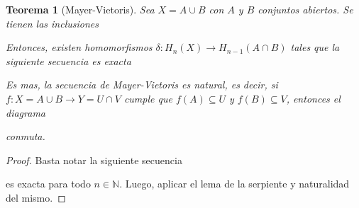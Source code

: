 \documentclass[aop]{imsart2}
\theoremstyle{plain}
\newtheorem{teo}{Teorema}[section]
\theoremstyle{remark}
\def \N {\mathbb{N}}
\begin{document}
\begin{teo}[Mayer-Vietoris]
    Sea $X=A\cup B$ con $A$ y $B$ conjuntos abiertos. Se tienen las inclusiones
    
    \vspace{2mm}
    \centerline{
    }
    \vspace{2mm}
    \noindent Entonces, existen homomorfismos $\delta:H_{n}(X)\to H_{n-1}(A\cap B)$ tales 
    que la siguiente secuencia es exacta
    
    \vspace{2mm}
    \centerline{
        \xymatrixcolsep{3pc}
    }
    \vspace{2mm}
    \noindent Es mas, la secuencia de Mayer-Vietoris es natural, es decir, si 
    $f:X=A\cup B\to Y=U\cap V$ cumple que $f(A)\subseteq U$ y $f(B)\subseteq V$, entonces el 
    diagrama
    
    \vspace{2mm}
    \centerline{
        \xymatrixcolsep{3pc}
    }
    \noindent conmuta.
\end{teo}

\begin{proof}
    Basta notar la siguiente secuencia

    \vspace{2mm}
    \centerline{
    }
    \vspace{2mm}
    \noindent es exacta para todo $n\in\N$. Luego, aplicar el lema de la serpiente y naturalidad 
    del mismo.
\end{proof}
\end{document}
